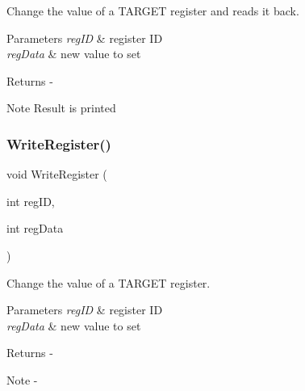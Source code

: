Change the value of a T\+A\+R\+G\+ET register and reads it back. 


\begin{DoxyParams}{Parameters}
{\em reg\+ID} & register ID \\
\hline
{\em reg\+Data} & new value to set\\
\hline
\end{DoxyParams}
\begin{DoxyReturn}{Returns}
-\/
\end{DoxyReturn}
\begin{DoxyNote}{Note}
Result is printed 
\end{DoxyNote}
\mbox{\label{_t_a_r_g_e_t_c___register_map_8h_a0171687cfd99ad3e2d9b00bdacd88d36}} 
\subsubsection{WriteRegister()}
{\footnotesize\ttfamily void Write\+Register (\begin{DoxyParamCaption}\item[{int}]{reg\+ID,  }\item[{int}]{reg\+Data }\end{DoxyParamCaption})}



Change the value of a T\+A\+R\+G\+ET register. 


\begin{DoxyParams}{Parameters}
{\em reg\+ID} & register ID \\
\hline
{\em reg\+Data} & new value to set\\
\hline
\end{DoxyParams}
\begin{DoxyReturn}{Returns}
-\/
\end{DoxyReturn}
\begin{DoxyNote}{Note}
-\/ 
\end{DoxyNote}
